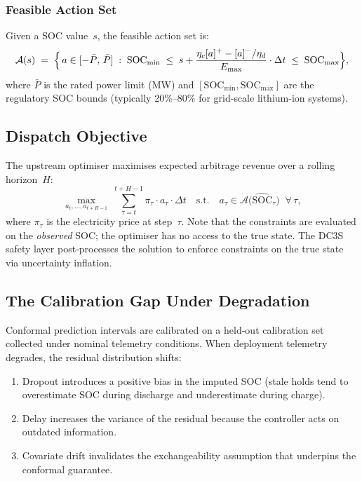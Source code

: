 \subsubsection{Feasible Action Set}

Given a SOC value~$s$, the feasible action set is:
\begin{equation}
\label{eq:feasible-set}
  \mathcal{A}(s) \;=\; \Bigl\{\,a \in [-\bar{P},\, \bar{P}] \;:\;
  \mathrm{SOC}_{\min} \;\le\;
  s + \frac{\eta_c [a]^{+} - [a]^{-}/\eta_d}{E_{\max}} \cdot \Delta t
  \;\le\; \mathrm{SOC}_{\max}\Bigr\},
\end{equation}
where $\bar{P}$ is the rated power limit (MW) and
$[\mathrm{SOC}_{\min}, \mathrm{SOC}_{\max}]$ are the regulatory SOC
bounds (typically 20\%--80\% for grid-scale lithium-ion systems).

\subsection{Dispatch Objective}

The upstream optimiser maximises expected arbitrage revenue over a
rolling horizon~$H$:
\begin{equation}
\label{eq:dispatch-obj}
  \max_{a_t, \ldots, a_{t+H-1}} \;\sum_{\tau=t}^{t+H-1}
  \pi_\tau \cdot a_\tau \cdot \Delta t
  \quad \text{s.t.} \quad
  a_\tau \in \mathcal{A}\!\bigl(\widehat{\mathrm{SOC}}_\tau\bigr)
  \;\;\forall\, \tau,
\end{equation}
where $\pi_\tau$ is the electricity price at step~$\tau$.  Note that the
constraints are evaluated on the \emph{observed} SOC; the optimiser has
no access to the true state.  The DC3S safety layer post-processes the
solution to enforce constraints on the true state via uncertainty
inflation.

\subsection{The Calibration Gap Under Degradation}
\label{sec:calibration-gap}

Conformal prediction intervals are calibrated on a held-out calibration
set collected under nominal telemetry conditions.  When deployment
telemetry degrades, the residual distribution shifts:

\begin{enumerate}
  \item Dropout introduces a positive bias in the imputed SOC (stale
    holds tend to overestimate SOC during discharge and underestimate
    during charge).
  \item Delay increases the variance of the residual because the
    controller acts on outdated information.
  \item Covariate drift invalidates the exchangeability assumption that
    underpins the conformal guarantee.
\end{enumerate}

